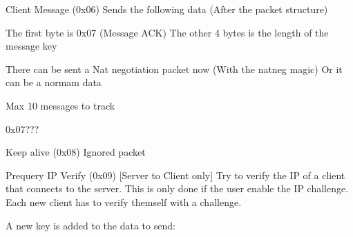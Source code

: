 \documentclass[oneside,titlepage,a4paper]{Definition/retrospy} %
\begin{document}
Client Message (0x06)
Sends the following data (After the packet structure)

The first byte is 0x07 (Message ACK)
The other 4 bytes is the length of the message key

There can be sent a Nat negotiation packet now (With the natneg magic)
Or it can be a normam data

Max 10 messages to track

0x07???

Keep alive (0x08)
Ignored packet

Prequery IP Verify (0x09) [Server to Client only]
Try to verify the IP of a client that connects to the server.
This is only done if the user enable the IP challenge.
Each new client has to verify themself with a challenge.

A new key is added to the data to send:



\end{document}

